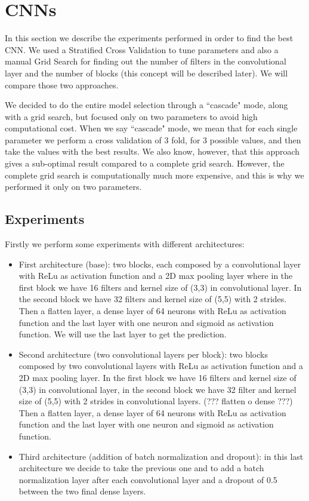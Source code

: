 \documentclass{article}
\begin{document}
\section{CNNs}
\label{sec:cnn}
In this section we describe the experiments performed in order to find the best CNN. We used a  Stratified Cross Validation to tune parameters and also a manual Grid Search for finding out the number of filters in the convolutional layer and the number of blocks (this concept will be described later). We will compare those two approaches.

We decided to do the entire model selection through a ``cascade" mode, along with a grid search, but focused only on two parameters to avoid high computational cost. When we say ``cascade" mode, we mean that for each single parameter we perform a cross validation of 3 fold, for 3 possible values, and then take the values with the best results. We also know, however, that this approach gives a sub-optimal result compared to a complete grid search. However, the complete grid search is computationally much more expensive, and this is why we performed it only on two parameters.

\subsection{Experiments}
Firstly we perform some experiments with different architectures:
\begin{itemize}
    \item First architecture (base): two blocks, each composed by a convolutional layer with ReLu as activation function and a 2D max pooling layer where in the first block we have 16 filters and kernel size of (3,3) in convolutional layer. In the second block we have 32 filters and kernel size of (5,5) with 2 strides. Then a flatten layer, a dense layer of 64 neurons with ReLu as activation function and the last layer with one neuron and sigmoid as activation function. We will use the last layer to get the prediction.
    \item Second architecture (two convolutional layers per block): two blocks composed by two convolutional layers with ReLu as activation function and a 2D max pooling layer. In the first block we have 16 filters and kernel size of (3,3) in convolutional layer, in the second block we have 32 filter and kernel size of (5,5) with 2 strides in convolutional layers. (??? flatten o dense ???) Then a flatten layer, a dense layer of 64 neurons with ReLu as activation function and the last layer with one neuron and sigmoid as activation function.
    \item Third architecture (addition of batch normalization and dropout): in this last architecture we decide to take the previous one and to add a batch normalization layer after each convolutional layer and a dropout of 0.5 between the two final dense layers.
\end{itemize}
\end{document}
